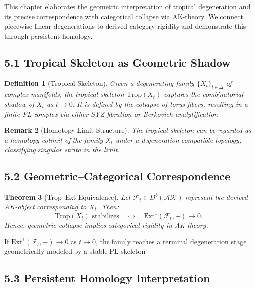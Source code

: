 \documentclass[11pt]{article}
\newtheorem{theorem}{Theorem}[section]
\newtheorem{definition}[theorem]{Definition}
\newtheorem{remark}[theorem]{Remark}
\begin{document}
This chapter elaborates the geometric interpretation of tropical degeneration and its precise correspondence with categorical collapse via AK-theory. We connect piecewise-linear degenerations to derived category rigidity and demonstrate this through persistent homology.

\subsection{5.1 Tropical Skeleton as Geometric Shadow}

\begin{definition}[Tropical Skeleton]
Given a degenerating family $\{ X_t \}_{t \in \Delta}$ of complex manifolds, the tropical skeleton $\mathrm{Trop}(X_t)$ captures the combinatorial shadow of $X_t$ as $t \to 0$. It is defined by the collapse of torus fibers, resulting in a finite PL-complex via either SYZ fibration or Berkovich analytification.
\end{definition}

\begin{remark}[Homotopy Limit Structure]
The tropical skeleton can be regarded as a homotopy colimit of the family $X_t$ under a degeneration-compatible topology, classifying singular strata in the limit.
\end{remark}

\subsection{5.2 Geometric–Categorical Correspondence}

\begin{theorem}[Trop--Ext Equivalence]
Let $\mathcal{F}_t \in D^b(\mathcal{AK})$ represent the derived AK-object corresponding to $X_t$. Then:
\[
\mathrm{Trop}(X_t) \text{ stabilizes} \quad \Longleftrightarrow \quad \mathrm{Ext}^1(\mathcal{F}_t, -) \to 0.
\]
Hence, geometric collapse implies categorical rigidity in AK-theory.
\end{theorem}

\begin{corollary}
If $\mathrm{Ext}^1(\mathcal{F}_t, -) \to 0$ as $t \to 0$, the family reaches a terminal degeneration stage geometrically modeled by a stable PL-skeleton.
\end{corollary}

\subsection{5.3 Persistent Homology Interpretation}
\end{document}
